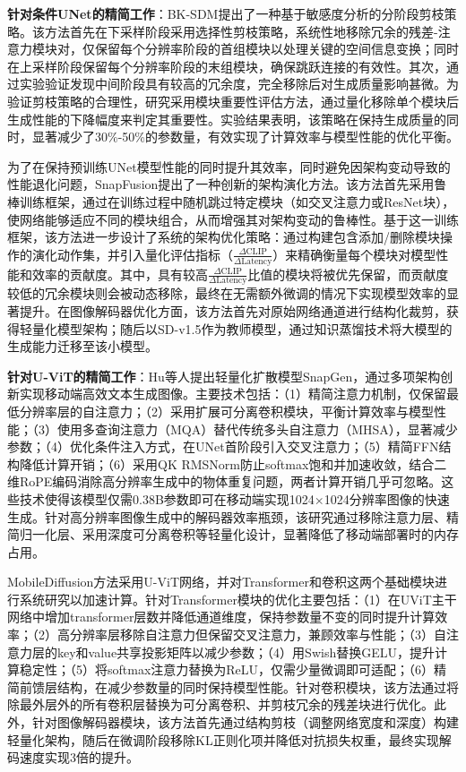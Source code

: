 \documentclass[11pt,a4paper,UTF8]{ctexart}
\begin{document}
\textbf{针对条件UNet的精简工作}：BK-SDM\cite{kim2023bk}提出了一种基于敏感度分析的分阶段剪枝策略。该方法首先在下采样阶段采用选择性剪枝策略，系统性地移除冗余的残差-注意力模块对，仅保留每个分辨率阶段的首组模块以处理关键的空间信息变换；同时在上采样阶段保留每个分辨率阶段的末组模块，确保跳跃连接的有效性。其次，通过实验验证发现中间阶段具有较高的冗余度，完全移除后对生成质量影响甚微。为验证剪枝策略的合理性，研究采用模块重要性评估方法，通过量化移除单个模块后生成性能的下降幅度来判定其重要性。实验结果表明，该策略在保持生成质量的同时，显著减少了30\%-50\%的参数量，有效实现了计算效率与模型性能的优化平衡。

为了在保持预训练UNet模型性能的同时提升其效率，同时避免因架构变动导致的性能退化问题，SnapFusion\cite{li2023snapfusion}提出了一种创新的架构演化方法。该方法首先采用鲁棒训练框架，通过在训练过程中随机跳过特定模块（如交叉注意力或ResNet块），使网络能够适应不同的模块组合，从而增强其对架构变动的鲁棒性。基于这一训练框架，该方法进一步设计了系统的架构优化策略：通过构建包含添加/删除模块操作的演化动作集，并引入量化评估指标（$\frac{\Delta\text{CLIP}}{\Delta\text{Latency}}$）来精确衡量每个模块对模型性能和效率的贡献度。其中，具有较高$\frac{\Delta\text{CLIP}}{\Delta\text{Latency}}$比值的模块将被优先保留，而贡献度较低的冗余模块则会被动态移除，最终在无需额外微调的情况下实现模型效率的显著提升。在图像解码器优化方面，该方法首先对原始网络通道进行结构化裁剪，获得轻量化模型架构；随后以SD-v1.5作为教师模型，通过知识蒸馏技术将大模型的生成能力迁移至该小模型。

\textbf{针对U-ViT的精简工作}：Hu等人\cite{hu2024snapgen}提出轻量化扩散模型SnapGen，通过多项架构创新实现移动端高效文本生成图像。主要技术包括：（1）精简注意力机制，仅保留最低分辨率层的自注意力；（2）采用扩展可分离卷积\cite{howard2017mobilenets}模块，平衡计算效率与模型性能；（3）使用多查询注意力（MQA）\cite{shazeer2019fast}替代传统多头自注意力（MHSA），显著减少参数；（4）优化条件注入方式，在UNet首阶段引入交叉注意力；（5）精简FFN结构降低计算开销；（6）采用QK RMSNorm\cite{henry2020query,zhang2019root}防止softmax饱和并加速收敛，结合二维RoPE编码\cite{su2024roformer}消除高分辨率生成中的物体重复问题，两者计算开销几乎可忽略。这些技术使得该模型仅需0.38B参数即可在移动端实现1024×1024分辨率图像的快速生成。针对高分辨率图像生成中的解码器效率瓶颈，该研究通过移除注意力层、精简归一化层、采用深度可分离卷积等轻量化设计，显著降低了移动端部署时的内存占用。

MobileDiffusion\cite{zhao2024mobilediffusion}方法采用U-ViT网络，并对Transformer和卷积这两个基础模块进行系统研究以加速计算。针对Transformer模块的优化主要包括：（1）在UViT主干网络中增加transformer层数并降低通道维度，保持参数量不变的同时提升计算效率；（2）高分辨率层移除自注意力但保留交叉注意力，兼顾效率与性能；（3）自注意力层的key和value共享投影矩阵以减少参数；（4）用Swish替换GELU，提升计算稳定性；（5）将softmax注意力替换为ReLU，仅需少量微调即可适配；（6）精简前馈层结构，在减少参数量的同时保持模型性能。针对卷积模块，该方法通过将除最外层外的所有卷积层替换为可分离卷积\cite{howard2017mobilenets}、并剪枝冗余的残差块进行优化。此外，针对图像解码器模块，该方法首先通过结构剪枝（调整网络宽度和深度）构建轻量化架构，随后在微调阶段移除KL正则化项并降低对抗损失权重，最终实现解码速度实现3倍的提升。
\end{document}
